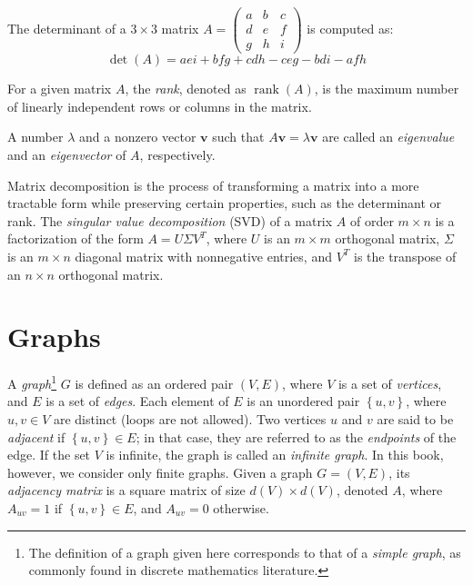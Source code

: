 \begin{example}
The determinant of a $3 \times 3$ matrix $A = \left( \begin{smallmatrix} a & b & c \\ d & e & f \\ g & h & i \end{smallmatrix} \right)$ is computed as:
\[
\det(A) = aei + bfg + cdh - ceg - bdi - afh
\]
\end{example}

For a given matrix $A$, the \emph{rank}, denoted as $\operatorname{rank}(A)$, is the maximum number of linearly independent rows or columns in the matrix.

A number $\lambda$ and a nonzero vector $\mathbf{v}$ such that $A \mathbf{v} = \lambda \mathbf{v}$ are called an \emph{eigenvalue} and an \emph{eigenvector} of $A$, respectively.

Matrix decomposition is the process of transforming a matrix into a more tractable form while preserving certain properties, such as the determinant or rank. The \emph{singular value decomposition} (SVD) of a matrix $A$ of order $m \times n$ is a factorization of the form $A = U \Sigma V^T$, where $U$ is an $m \times m$ orthogonal matrix, $\Sigma$ is an $m \times n$ diagonal matrix with nonnegative entries, and $V^T$ is the transpose of an $n \times n$ orthogonal matrix.

%
%

\section{Graphs}
\label{sec:Graphs}

A \emph{graph}\footnote{The definition of a graph given here corresponds to that of a \emph{simple graph}, as commonly found in discrete mathematics literature.} $G$ is defined as an ordered pair $(V, E)$, where $V$ is a set of \emph{vertices}, and $E$ is a set of \emph{edges}. Each element of $E$ is an unordered pair $\left\{ u, v \right\}$, where $u, v \in V$ are distinct (loops are not allowed). Two vertices $u$ and $v$ are said to be \emph{adjacent} if $\left\{ u, v \right\} \in E$; in that case, they are referred to as the \emph{endpoints} of the edge. If the set $V$ is infinite, the graph is called an \emph{infinite graph}. In this book, however, we consider only finite graphs. Given a graph $G = (V, E)$, its \emph{adjacency matrix} is a square matrix of size $d(V) \times d(V)$, denoted $A$, where $A_{uv} = 1$ if $\left\{ u, v \right\} \in E$, and $A_{uv} = 0$ otherwise.

